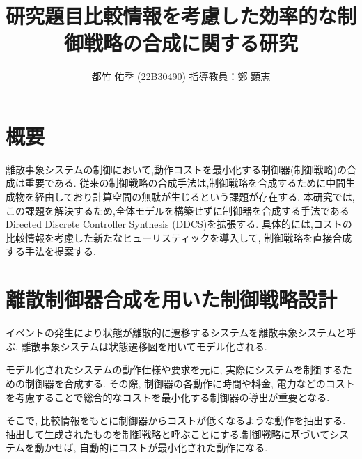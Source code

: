 \documentclass[11pt]{jarticle}
\begin{document}

\title{研究題目}
\title{比較情報を考慮した効率的な制御戦略の合成に関する研究}
\author{都竹 佑季 (22B30490) \;\; 指導教員：鄭 顕志}
\date{\empty} %
\maketitle %
\thispagestyle{fancy}


\section{概要} %
離散事象システムの制御において,動作コストを最小化する制御器(制御戦略)の合成は重要である.
従来の制御戦略の合成手法は,制御戦略を合成するために中間生成物を経由しており計算空間の無駄が生じるという課題が存在する.
本研究では,この課題を解決するため,全体モデルを構築せずに制御器を合成する手法であるDirected Discrete Controller Synthesis (DDCS)\cite{ddcs}を拡張する.
具体的には,コストの比較情報を考慮した新たなヒューリスティックを導入して, 制御戦略を直接合成する手法を提案する.

\section{離散制御器合成を用いた制御戦略設計}
イベントの発生により状態が離散的に遷移するシステムを離散事象システムと呼ぶ. 離散事象システムは状態遷移図を用いてモデル化される.

モデル化されたシステムの動作仕様や要求を元に, 実際にシステムを制御するための制御器を合成する. その際, 制御器の各動作に時間や料金, 電力などのコストを考慮することで総合的なコストを最小化する制御器の導出が重要となる. 

そこで, 比較情報をもとに制御器からコストが低くなるような動作を抽出する. 抽出して生成されたものを制御戦略と呼ぶことにする.制御戦略に基づいてシステムを動かせば, 自動的にコストが最小化された動作になる.
\end{document}
